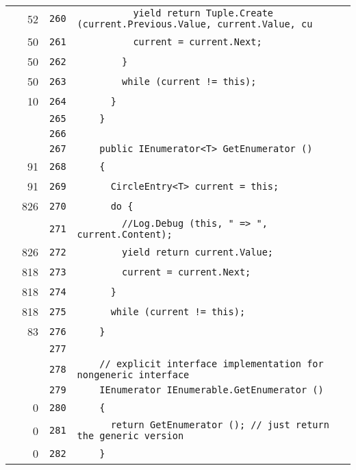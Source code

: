 \documentclass[a4paper,10pt]{article}
\begin{document}
\begin{longtable}[l]{lrrl}
\cellcolor{green} & 52 & \verb~260~ & \verb~          yield return Tuple.Create (current.Previous.Value, current.Value, cu~\\
\cellcolor{green} & 50 & \verb~261~ & \verb~          current = current.Next;~\\
\cellcolor{green} & 50 & \verb~262~ & \verb~        }~\\
\cellcolor{green} & 50 & \verb~263~ & \verb~        while (current != this);~\\
\cellcolor{green} & 10 & \verb~264~ & \verb~      }~\\
\cellcolor{gray} &  & \verb~265~ & \verb~    }~\\
\cellcolor{gray} &  & \verb~266~ & \verb~~\\
\cellcolor{gray} &  & \verb~267~ & \verb~    public IEnumerator<T> GetEnumerator ()~\\
\cellcolor{green} & 91 & \verb~268~ & \verb~    {~\\
\cellcolor{green} & 91 & \verb~269~ & \verb~      CircleEntry<T> current = this;~\\
\cellcolor{green} & 826 & \verb~270~ & \verb~      do {~\\
\cellcolor{gray} &  & \verb~271~ & \verb~        //Log.Debug (this, " => ", current.Content);~\\
\cellcolor{green} & 826 & \verb~272~ & \verb~        yield return current.Value;~\\
\cellcolor{green} & 818 & \verb~273~ & \verb~        current = current.Next;~\\
\cellcolor{green} & 818 & \verb~274~ & \verb~      }~\\
\cellcolor{green} & 818 & \verb~275~ & \verb~      while (current != this);~\\
\cellcolor{green} & 83 & \verb~276~ & \verb~    }~\\
\cellcolor{gray} &  & \verb~277~ & \verb~~\\
\cellcolor{gray} &  & \verb~278~ & \verb~    // explicit interface implementation for nongeneric interface~\\
\cellcolor{gray} &  & \verb~279~ & \verb~    IEnumerator IEnumerable.GetEnumerator ()~\\
\cellcolor{red} & 0 & \verb~280~ & \verb~    {~\\
\cellcolor{red} & 0 & \verb~281~ & \verb~      return GetEnumerator (); // just return the generic version~\\
\cellcolor{red} & 0 & \verb~282~ & \verb~    }~\\

\end{longtable}
\end{document}
